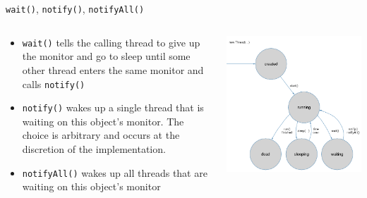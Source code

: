 \begin{frame}{\lstinline!wait()!, \lstinline!notify()!, \lstinline!notifyAll()!}
  \begin{columns}[c]
    \begin{column}{0.5\textwidth}
      \begin{itemize}
      \item \lstinline!wait()! tells the calling thread to give up the
        monitor and go to sleep until some other thread enters the
        same monitor and calls \lstinline!notify()!
      \item \lstinline!notify()! wakes up a single thread that is
        waiting on this object's monitor. The choice is arbitrary and
        occurs at the discretion of the implementation.
      \item \lstinline!notifyAll()! wakes up all threads that are
        waiting on this object's monitor
      \end{itemize}
    \end{column}
    \begin{column}{0.5\textwidth}
      \begin{center}
        \includegraphics[width=\textwidth]{figures/thread}
      \end{center}
    \end{column}
  \end{columns}
\end{frame}

